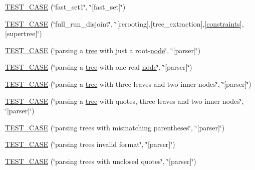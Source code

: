 \begin{DoxyCompactItemize}
\item 
\hyperlink{namespaceterraces_1_1tests_afdee18895870cc92e51399a34cce9b14}{T\+E\+S\+T\+\_\+\+C\+A\+SE} (\char`\"{}fast\+\_\+set1\char`\"{}, \char`\"{}\mbox{[}fast\+\_\+set\mbox{]}\char`\"{})
\item 
\hyperlink{namespaceterraces_1_1tests_ad6b848be72813b49b4588188a86abd72}{T\+E\+S\+T\+\_\+\+C\+A\+SE} (\char`\"{}full\+\_\+run\+\_\+disjoint\char`\"{}, \char`\"{}\mbox{[}rerooting\mbox{]},\mbox{[}tree\+\_\+extraction\mbox{]},\mbox{[}\hyperlink{namespaceterraces_a6f603ffd30ed4d902fce6424492e0581}{constraints}\mbox{]},\mbox{[}supertree\mbox{]}\char`\"{})
\item 
\hyperlink{namespaceterraces_1_1tests_ab4c954fbc11551018312853c94534ed3}{T\+E\+S\+T\+\_\+\+C\+A\+SE} (\char`\"{}parsing a \hyperlink{namespaceterraces_a07aaf7feec4a22c6cdefc14c5a81bdd0}{tree} with just a root-\/\hyperlink{structterraces_1_1node}{node}\char`\"{}, \char`\"{}\mbox{[}parser\mbox{]}\char`\"{})
\item 
\hyperlink{namespaceterraces_1_1tests_a93f8a67bbce7f45339978938e5d38ee1}{T\+E\+S\+T\+\_\+\+C\+A\+SE} (\char`\"{}parsing a \hyperlink{namespaceterraces_a07aaf7feec4a22c6cdefc14c5a81bdd0}{tree} with one real \hyperlink{structterraces_1_1node}{node}\char`\"{}, \char`\"{}\mbox{[}parser\mbox{]}\char`\"{})
\item 
\hyperlink{namespaceterraces_1_1tests_a3f8d7bde6f8a6617b4a76d6141dcdd61}{T\+E\+S\+T\+\_\+\+C\+A\+SE} (\char`\"{}parsing a \hyperlink{namespaceterraces_a07aaf7feec4a22c6cdefc14c5a81bdd0}{tree} with three leaves and two inner nodes\char`\"{}, \char`\"{}\mbox{[}parser\mbox{]}\char`\"{})
\item 
\hyperlink{namespaceterraces_1_1tests_aa039a85f0f327469d901208808e893c4}{T\+E\+S\+T\+\_\+\+C\+A\+SE} (\char`\"{}parsing a \hyperlink{namespaceterraces_a07aaf7feec4a22c6cdefc14c5a81bdd0}{tree} with quotes, three leaves and two inner nodes\char`\"{}, \char`\"{}\mbox{[}parser\mbox{]}\char`\"{})
\item 
\hyperlink{namespaceterraces_1_1tests_ad5d1f3ef582d7737a33c1cc9f7c33069}{T\+E\+S\+T\+\_\+\+C\+A\+SE} (\char`\"{}parsing trees with mismatching parentheses\char`\"{}, \char`\"{}\mbox{[}parser\mbox{]}\char`\"{})
\item 
\hyperlink{namespaceterraces_1_1tests_aca38600decf3253850ef17fe1d842f43}{T\+E\+S\+T\+\_\+\+C\+A\+SE} (\char`\"{}parsing trees invalid format\char`\"{}, \char`\"{}\mbox{[}parser\mbox{]}\char`\"{})
\item 
\hyperlink{namespaceterraces_1_1tests_ae533511c1d05bb0445690b7afefc83a2}{T\+E\+S\+T\+\_\+\+C\+A\+SE} (\char`\"{}parsing trees with unclosed quotes\char`\"{}, \char`\"{}\mbox{[}parser\mbox{]}\char`\"{})

\end{DoxyCompactItemize}
